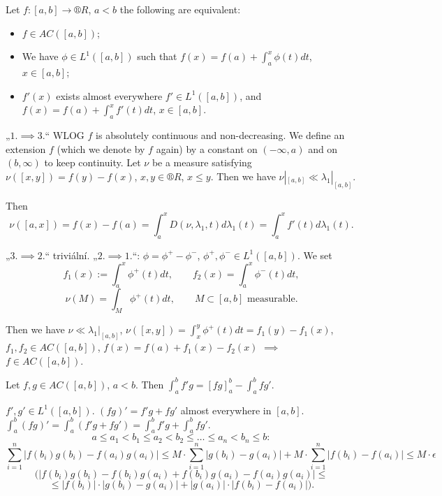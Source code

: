 \documentclass[12pt]{article}					%
\begin{document}

\begin{veta}
	Let $f: [a, b] \rightarrow ®R$, $a < b$ the following are equivalent:

	\begin{itemize}
		\item $f \in AC([a, b])$;
		\item We have $\phi \in L^1([a, b])$ such that $f(x) = f(a) + \int_a^x \phi(t) dt$, $x \in [a, b]$;
		\item $f'(x)$ exists almost everywhere $f' \in L^1([a, b])$, and $f(x) = f(a) + \int_a^x f'(t) dt$, $x \in [a, b]$.
	\end{itemize}

	\begin{dukazin}
		„$1. \implies 3.$“ WLOG $f$ is absolutely continuous and non-decreasing. We define an extension $f$ (which we denote by $f$ again) by a constant on $(-∞, a)$ and on $(b, ∞)$ to keep continuity. Let $\nu$ be a measure satisfying $\nu([x, y]) = f(y) - f(x)$, $x, y \in ®R$, $x ≤ y$. Then we have $\nu|_{[a, b]} \ll \lambda_1|_{[a, b]}$.

		Then
		$$ \nu([a, x]) = f(x) - f(a) = \int_a^x D(\nu, \lambda_1, t) d\lambda_1(t) = \int_a^x f'(t) d\lambda_1(t). $$

		„$3. \implies 2.$“ triviální. „$2. \implies 1.$“: $\phi = \phi^+ - \phi^-$, $\phi^+, \phi^- \in L^1([a, b])$. We set
		$$ f_1(x) := \int_a^x \phi^+(t) dt, \qquad f_2(x) = \int_a^x \phi^-(t) dt, $$
		$$ \nu(M) = \int_M \phi^+(t) dt, \qquad M \subset [a, b] \text{ measurable}. $$
		
		Then we have $\nu \ll \lambda_1|_{[a, b]}$, $\nu([x, y]) = \int_x^y \phi^+(t) dt = f_1(y) - f_1(x)$, $f_1, f_2 \in AC([a, b])$, $f(x) = f(a) + f_1(x) - f_2(x)$ $\implies$ $f \in AC([a, b])$.
	\end{dukazin}
\end{veta}

\begin{veta}
	Let $f, g \in AC([a, b])$, $a < b$. Then $\int_a^b f' g = [f g]_a^b - \int_a^b f g'$.

	\begin{dukazin}
		$f', g' \in L^1([a, b])$. $(fg)' = f'g + fg'$ almost everywhere in $[a, b]$. $\int_a^b (fg)' = \int_a^b (f'g + fg') = \int_a^b f'g + \int_a^b f g'$.
		$$ a ≤ a_1 < b_1 ≤ a_2 < b_2 ≤ … ≤ a_n < b_n ≤ b: $$
		$$ \sum_{i=1}^n |f(b_i)g(b_i) - f(a_i)g(a_i)| ≤ M·\sum_{i=1}^n |g(b_i) - g(a_i)| + M·\sum_{i=1}^n |f(b_i) - f(a_i)| ≤ M·\epsilon $$
		$$ (|f(b_i)g(b_i) - f(b_i)g(a_i) + f(b_i)g(a_i) - f(a_i)g(a_i)| ≤ $$
		$$ ≤ |f(b_i)|·|g(b_i) - g(a_i)| + |g(a_i)|·|f(b_i) - f(a_i)|). $$
	\end{dukazin}
\end{veta}
\end{document}
